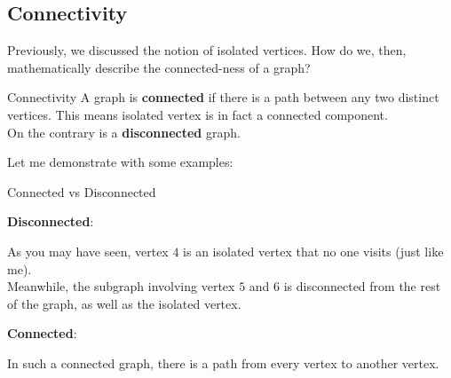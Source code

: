 \subsection{Connectivity}
Previously, we discussed the notion of isolated vertices. How do we, then, mathematically describe the connected-ness of a graph?
\begin{ln-define}{Connectivity}{}
    A graph is \textbf{connected} if there is a path between any two distinct vertices. This means isolated vertex is in fact a connected component. \\
    On the contrary is a \textbf{disconnected} graph.
\end{ln-define}
Let me demonstrate with some examples:
\begin{ln-fig}[sidebyside]{Connected vs Disconnected}{}
    \begin{center}
        \textbf{Disconnected}: \\

        \vspace{0.2cm}
    \end{center}
    As you may have seen, vertex $4$ is an isolated vertex that no one visits (just like me). \\
    Meanwhile, the subgraph involving vertex $5$ and $6$ is disconnected from the rest of the graph, as well as the isolated vertex. 
    \tcblower
    \begin{center}
        \textbf{Connected}:
        
        \vspace{0.2cm}
    \end{center}
    In such a connected graph, there is a path from every vertex to another vertex.
    \\
    \\
    \\
\end{ln-fig}

